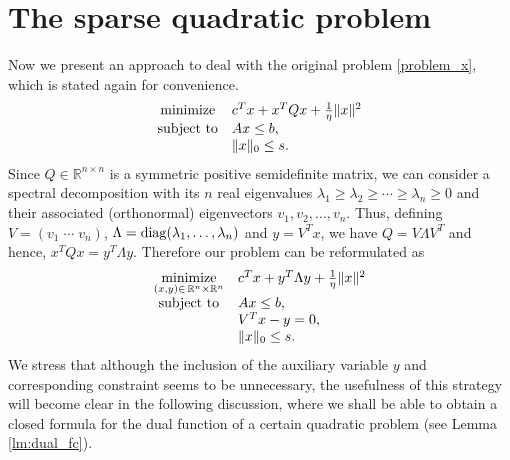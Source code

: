\documentclass[smallextended,referee,envcountsect]{svjour3}
\newcommand{\R}{\mathbb{R}}
\begin{document}
\section{The sparse quadratic problem}
\label{sec:sparse_problem}
Now we present an approach to deal with the original problem \eqref{problem_x}, which 
is stated again for convenience. 
$$
\begin{array}{cl}
\mathop{\rm minimize } & c^Tx+x^TQx+\frac{1}{\eta}\|x\|^2 \\ 
{\rm subject\ to } & Ax\leq b, \\ 
& \|x\|_0\leq s.
\end{array}
$$
Since $Q\in\R^{n\times n}$ is a symmetric positive semidefinite matrix, we can consider 
a spectral decomposition with its $n$ real eigenvalues 
$\lambda_1\geq\lambda_2\geq\cdots\geq\lambda_n\geq 0$ and their associated (orthonormal) 
eigenvectors $v_1, v_2, \ldots, v_n$. Thus, defining $V=(v_1\;\cdots\;v_n)$, 
$\Lambda={\rm diag}(\lambda_1,\ldots,\lambda_n)$ and $y=V^Tx$, we have $Q=V\Lambda V^T$ 
and hence, $x^TQx=y^T\Lambda y$. Therefore our problem can be reformulated as 
\begin{equation}
\label{problem_xy}
\begin{array}{cl}
\displaystyle\mathop{\rm minimize}_{(x,y)\in\,\R^n\times\R^n} & 
c^Tx+y^T\Lambda y+\textstyle\frac{1}{\eta}\|x\|^2 \\ 
{\rm subject\ to} & Ax \leq b, \\ 
& V^Tx-y = 0, \\ 
& \|x\|_0\leq s.
\end{array}
\end{equation}
We stress that although the inclusion of the auxiliary variable $y$ and 
corresponding constraint seems to be unnecessary, the usefulness of this 
strategy will become clear in the following discussion, where we shall be able to 
obtain a closed formula for the dual function of a certain quadratic problem (see 
Lemma \ref{lm:dual_fc}).
\end{document}
